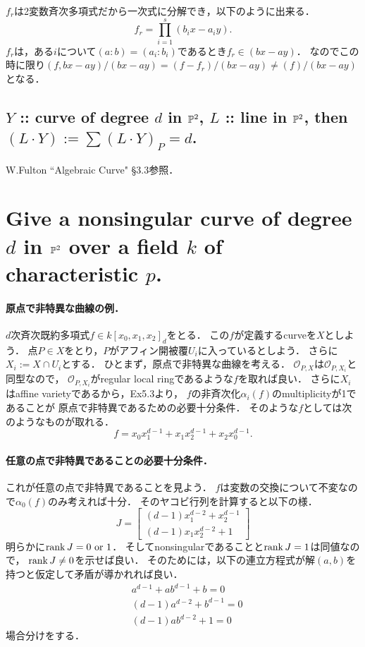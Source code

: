 \documentclass[a4paper]{jsarticle}
\begin{document}
    $f_r$は2変数斉次多項式だから一次式に分解でき，以下のように出来る．
    \[ f_r=\prod_{i=1}^s (b_i x-a_i y). \]
    $f_r$は，ある$i$について$(a:b)=(a_i:b_i)$であるとき$f_r \in (bx-ay)$．
    なのでこの時に限り$(f,bx-ay)/(bx-ay)=(f-f_r)/(bx-ay) \neq (f)/(bx-ay)$となる．

    \subsection{$Y$ :: curve of degree $d$ in $\mathbb{P}^2$, $L$ :: line in $\mathbb{P}^2$, then $(L \cdot Y):=\sum (L \cdot Y)_P=d$.}
    W.Fulton ``Algebraic Curve" \S 3.3参照．

\section{Give a nonsingular curve of degree $d$ in $\mathbb{P}^2$ over a field $k$ of characteristic $p$.} %
    \paragraph{原点で非特異な曲線の例．}
    $d$次斉次既約多項式$f \in k[x_0, x_1, x_2]_d$をとる．
    この$f$が定義するcurveを$X$としよう．
    点$P \in X$をとり，$P$がアフィン開被覆$U_i$に入っているとしよう．
    さらに$X_i:=X \cap U_i$とする．
    ひとまず，原点で非特異な曲線を考える．
    $\mathcal{O}_{P,X}$は$\mathcal{O}_{P,X_i}$と同型なので，
    $\mathcal{O}_{P,X_i}$がregular local ringであるような$f$を取れば良い．
    さらに$X_i$はaffine varietyであるから，Ex5.3より，
    $f$の非斉次化$\alpha_i(f)$のmultiplicityが1であることが
    原点で非特異であるための必要十分条件．
    そのような$f$としては次のようなものが取れる．
    \[ f=x_0 x_1^{d-1}+x_1 x_2^{d-1}+x_2 x_0^{d-1}. \]

    \paragraph{任意の点で非特異であることの必要十分条件．}
    これが任意の点で非特異であることを見よう．
    $f$は変数の交換について不変なので$\alpha_0(f)$のみ考えれば十分．
    そのヤコビ行列を計算すると以下の様．
    \[
        J=
        \begin{bmatrix}
            (d-1) x_1^{d-2}+x_2^{d-1} \\
            (d-1) x_1 x_2^{d-2}+1
        \end{bmatrix}
    \]
    明らかに$\operatorname{rank} J=0 \text{ or } 1$．
    そしてnonsingularであることと$\operatorname{rank} J=1$は同値なので，
    $\operatorname{rank} J \neq 0$を示せば良い．
    そのためには，以下の連立方程式が解$(a,b)$を持つと仮定して矛盾が導かれれば良い．
    \begin{align}
        &a^{d-1}+ab^{d-1}+b = 0 \label{eq:5-1}\\
        &(d-1)a^{d-2}+b^{d-1} = 0 \label{eq:5-2} \\
        &(d-1)a b^{d-2}+1 = 0 \label{eq:5-3}
    \end{align}
    場合分けをする．
\end{document}
